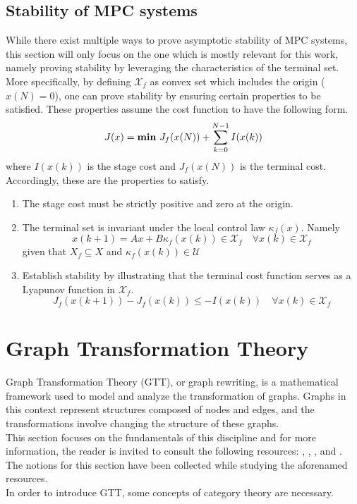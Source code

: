 \subsection{Stability of MPC systems}\label{sec:stable_mpc_systems}
While there exist multiple ways to prove asymptotic stability of MPC systems, this section will only focus on the one which is mostly relevant for this work, namely proving stability by leveraging the characteristics of the terminal set. More specifically, by defining $\mathcal{X}_f$ as convex set which includes the origin ($x(N) = 0$), one can prove stability by ensuring certain properties to be satisfied. These properties assume the cost function to have the following form. 
\begin{equation}
	J(x) = \text{\textbf{min} } J_f(x(N)) + \sum_{k =0}^{N-1}I(x(k))
\end{equation}
where $I(x(k))$ is the stage cost and $J_f(x(N))$ is the terminal cost. \\
Accordingly, these are the properties to satisfy.
\begin{enumerate}
	\item The stage cost must be strictly positive and zero at the origin.
	\item The terminal set is invariant under the local control law $\kappa_f(x)$. Namely 
	\begin{equation}
		x(k+1) = Ax + B\kappa_f(x(k))\in\mathcal{X}_f \quad \forall x(k)\in \mathcal{X}_f
	\end{equation}
	given that $X_f \subseteq X$ and $\kappa_f(x(k)) \in \mathcal{U}$
	 
	\item Establish stability by illustrating that the terminal cost function serves as a Lyapunov function in $\mathcal{X}_f$. 
	\begin{equation}
		J_f(x(k+1)) - J_f(x(k)) \leq -I(x(k))\quad \forall x(k) \in \mathcal{X}_f
	\end{equation}
\end{enumerate}


\section{Graph Transformation Theory}\label{sec:graph_transformation_theory}
Graph Transformation Theory (GTT), or graph rewriting, is a mathematical framework used to model and analyze the transformation of graphs. Graphs in this context represent structures composed of nodes and edges, and the transformations involve changing the structure of these graphs.\\
This section focuses on the fundamentals of this discipline and for more information, the reader is invited to consult the following resources: \cite{HECKEL2006187}, \cite{handbook_of_gg}, \cite{essential_on_graph_theory}, \cite{2123-19534} and \cite{gtt_se}. The notions for this section have been collected while studying the aforenamed resources. \\
In order to introduce GTT, some concepts of category theory are necessary. \\

